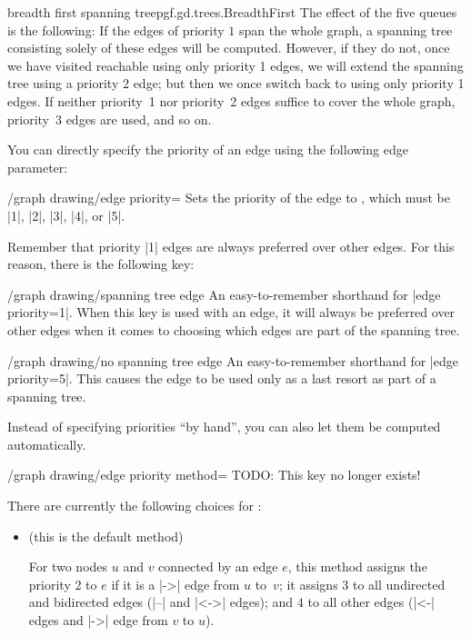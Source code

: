 \begin{gdalgorithm}{breadth first spanning tree}{pgf.gd.trees.BreadthFirst}
  The effect of the five queues is the following: If the edges of
  priority $1$ span the whole graph, a spanning tree consisting solely
  of these edges will be computed. However, if they do not, once we
  have visited reachable using only priority 1 edges, we will extend
  the spanning tree using a priority 2 edge; but then we once switch
  back to using only priority 1 edges. If neither priority~1 nor
  priority~2 edges suffice to cover the whole graph, priority~3 edges
  are used, and so on.
  
  You can directly specify the priority of an edge using the following
  edge parameter:
  \begin{key}{/graph drawing/edge priority=}
    Sets the priority of the edge to , which must be
    |1|, |2|, |3|, |4|, or  |5|.      
  \end{key}
  Remember that priority |1| edges are always preferred over other
  edges. For this reason, there is the following key:
  \begin{key}{/graph drawing/spanning tree edge}
    An easy-to-remember shorthand for |edge priority=1|. When this key
    is used with an edge, it will always be preferred over other edges
    when it comes to choosing which edges are part of the spanning tree.    
  \end{key}
  \begin{key}{/graph drawing/no spanning tree edge}
    An easy-to-remember shorthand for |edge priority=5|. This causes
    the edge to be used only as a last resort as part of a spanning
    tree. 
  \end{key}
  
  Instead of specifying priorities ``by hand'', you can also let them
  be computed automatically. 
  \begin{key}{/graph drawing/edge priority method=}
    TODO: This key no longer exists!
    
    There are currently the following choices for :
    \begin{itemize}
    \item {} (this is the default method)
      
      For two nodes $u$ and $v$ connected by an edge $e$, this method
      assigns the priority 2 to $e$ if it is a |->| edge from $u$
      to~$v$; it assigns $3$ to all undirected and bidirected edges
      (|--| and |<->| edges); and $4$ to all other edges (|<-| edges
      and |->| edge from $v$ to $u$).


\end{itemize}
\end{key}
\end{gdalgorithm}
